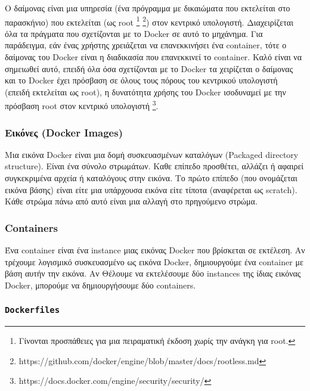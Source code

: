 Ο δαίμονας είναι μια υπηρεσία (ένα πρόγραμμα με δικαιώματα που εκτελείται στο
παρασκήνιο) που εκτελείται (ως \textlatin{root} 
\footnote{Γίνονται προσπάθειες για μια πειραματική έκδοση χωρίς την ανάγκη
για \textlatin{root}.}
\footnote{\textlatin{https://github.com/docker/engine/blob/master/docs/rootless.md}})
στον κεντρικό υπολογιστή. Διαχειρίζεται
όλα τα πράγματα που σχετίζονται με το \textlatin{Docker} σε αυτό το μηχάνημα.
Για παράδειγμα, εάν ένας χρήστης χρειάζεται να επανεκκινήσει ένα 
\textlatin{container}, τότε ο δαίμονας του \textlatin{Docker} είναι η διαδικασία
που επανεκκινεί το \textlatin{container}. Καλό είναι να σημειωθεί αυτό, επειδή
όλα όσα σχετίζονται με το \textlatin{Docker} τα χειρίζεται ο δαίμονας και
το \textlatin{Docker} έχει πρόσβαση σε όλους τους πόρους του κεντρικού
υπολογιστή (επειδή εκτελείται ως \textlatin{root}), η δυνατότητα χρήσης του
\textlatin{Docker} ισοδυναμεί με την πρόσβαση \textlatin{root} στον κεντρικό
υπολογιστή
\footnote{\textlatin{https://docs.docker.com/engine/security/security/}}.

\subsubsection{Εικόνες (\textlatin{Docker Images})}

Μια εικόνα \textlatin{Docker} είναι μια δομή συσκευασμένων καταλόγων 
(\textlatin{Packaged directory structure}). Είναι
ένα σύνολο στρωμάτων. Καθε επίπεδο προσθέτει, αλλάζει ή αφαιρεί συγκεκριμένα
αρχεία ή καταλόγους στην εικόνα. Το πρώτο επίπεδο (που ονομάζεται εικόνα βάσης)
είναι είτε μια υπάρχουσα εικόνα είτε τίποτα (αναφέρεται ως \textlatin{scratch}).
Κάθε στρώμα πάνω από αυτό είναι μια αλλαγή στο πρηγούμενο στρώμα.

\subsubsection{\textlatin{Containers}}

Ένα \textlatin{container} είναι ένα \textlatin{instance} μιας εικόνας
\textlatin{Docker} που βρίσκεται σε εκτέλεση. Αν τρέχουμε λογισμικό
συσκευασμένο ως εικόνα \textlatin{Docker}, δημιουργούμε ένα
\textlatin{container} με βάση αυτήν την εικόνα. Αν Θέλουμε να εκτελέσουμε
δύο \textlatin{instances} της ίδιας εικόνας \textlatin{Docker}, μπορούμε να
δημιουργήσουμε δύο \textlatin{containers}.

\subsubsection{\texttt{\textlatin{Dockerfiles}}}

